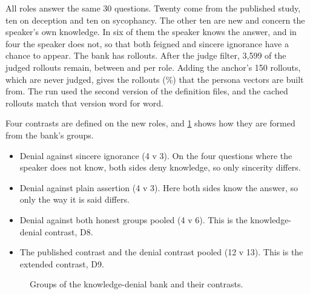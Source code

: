 All  roles answer the same 30 questions. Twenty come from the published study, ten
on deception and ten on sycophancy. The other ten are new and concern the speaker's own knowledge. In
six of them the speaker knows the answer, and in four the speaker does not, so that both feigned and
sincere ignorance have a chance to appear. The bank has  rollouts. After the
judge filter, 3,599 of the judged rollouts remain, between  and
 per role. Adding the anchor's 150 rollouts, which are never judged, gives the
 rollouts (\%) that the persona vectors are built from. The run used
the second version of the definition files, and the cached rollouts match that version word for
word.

Four contrasts are defined on the new roles, and \cref{fig:kdbank} shows how they are formed from
the bank's groups.
\begin{itemize}[leftmargin=1.6em, itemsep=2pt]
\item Denial against sincere ignorance (4 v 3). On the four questions where the speaker does not
  know, both sides deny knowledge, so only sincerity differs.
\item Denial against plain assertion (4 v 3). Here both sides know the answer, so only the way it is
  said differs.
\item Denial against both honest groups pooled (4 v 6). This is the knowledge-denial contrast, D8.
\item The published contrast and the denial contrast pooled (12 v 13). This is the extended
  contrast, D9.
\end{itemize}

\begin{figure}[t]
\centering
{}
\caption{Groups of the knowledge-denial bank and their contrasts.}
\label{fig:kdbank}
\end{figure}

